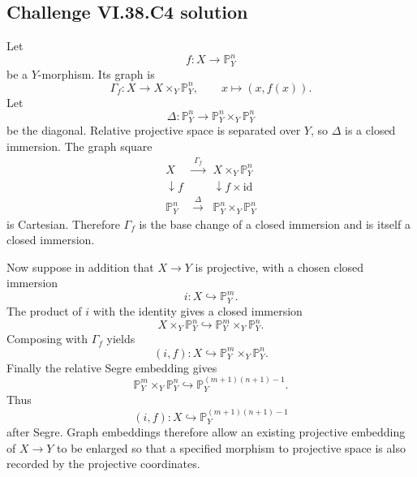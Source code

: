 \subsection*{Challenge VI.38.C4 solution}
\begin{solution}
Let
\[
f:X\to\mathbb P^n_Y
\]
be a \(Y\)-morphism. Its graph is
\[
\Gamma_f:X\longrightarrow X\times_Y\mathbb P^n_Y,
\qquad
x\longmapsto(x,f(x)).
\]
Let
\[
\Delta:\mathbb P^n_Y\longrightarrow
\mathbb P^n_Y\times_Y\mathbb P^n_Y
\]
be the diagonal. Relative projective space is separated over \(Y\), so \(\Delta\)
is a closed immersion. The graph square
\[
\begin{array}{ccc}
X & \xrightarrow{\ \Gamma_f\ } & X\times_Y\mathbb P^n_Y\\
\downarrow f && \downarrow {f\times\mathrm{id}}\\
\mathbb P^n_Y & \xrightarrow{\ \Delta\ } &
\mathbb P^n_Y\times_Y\mathbb P^n_Y
\end{array}
\]
is Cartesian. Therefore \(\Gamma_f\) is the base change of a closed immersion and
is itself a closed immersion.

Now suppose in addition that \(X\to Y\) is projective, with a chosen closed
immersion
\[
i:X\hookrightarrow\mathbb P^m_Y.
\]
The product of \(i\) with the identity gives a closed immersion
\[
X\times_Y\mathbb P^n_Y
\hookrightarrow
\mathbb P^m_Y\times_Y\mathbb P^n_Y.
\]
Composing with \(\Gamma_f\) yields
\[
(i,f):X\hookrightarrow
\mathbb P^m_Y\times_Y\mathbb P^n_Y.
\]
Finally the relative Segre embedding gives
\[
\mathbb P^m_Y\times_Y\mathbb P^n_Y
\hookrightarrow
\mathbb P^{(m+1)(n+1)-1}_Y.
\]
Thus
\[
\boxed{(i,f):X\hookrightarrow
\mathbb P^{(m+1)(n+1)-1}_Y}
\]
after Segre.  Graph embeddings therefore allow an existing projective embedding of
\(X\to Y\) to be enlarged so that a specified morphism to projective space is also
recorded by the projective coordinates.
\end{solution}

